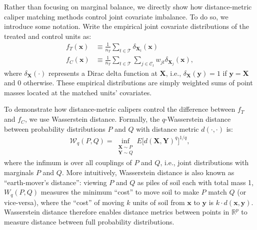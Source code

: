 \documentclass{article}
\newcommand{\bX}{\mathbf{X}}
\newcommand{\Xt}{\mathbf{X}_t}
\newcommand{\Xj}{\mathbf{X}_j}
\newcommand{\Rp}{\mathbb{R}^p}
\newcommand{\Ct}{\mathcal{C}_{t}}
\newcommand{\ind}[1]{\mathds{1} \{ #1 \} }
\begin{document}
Rather than focusing on marginal balance, we directly show how distance-metric caliper matching methods control joint covariate imbalance.
To do so, we introduce some notation.
Write the empirical joint covariate distributions of the treated and control units as:
\begin{align*}
    f_T(\mathbf{x}) 
    &\equiv \frac{1}{n_T} \sum_{t \in \mathcal{T}} \delta_{\Xt}(\mathbf{x}) \\
    f_C(\mathbf{x}) 
    &\equiv \frac{1}{n_T} \sum_{t \in \mathcal{T}} \sum_{j \in \Ct} w_{jt} \delta_{\Xj} (\mathbf{x}),
\end{align*}
where $\delta_{\bX}(\cdot)$ represents a Dirac delta function at $\bX$, i.e., $\delta_{\bX}(\mathbf{y}) = 1$ if $\mathbf{y} = \mathbf{X}$ and $0$ otherwise.
These empirical distributions are simply weighted sums of point masses located at the matched units' covariates.

To demonstrate how distance-metric calipers control the difference between $f_T$ and $f_C$, we use Wasserstein distance.
Formally, the $q$-Wasserstein distance between probability distributions $P$ and $Q$ with distance metric $d(\cdot, \cdot)$ is:
\begin{align*}
    \mathcal{W}_q(P, Q) = \inf_{\substack{\bX \sim P \\ \mathbf{Y} \sim Q}} E\big[ d(\bX, \mathbf{Y})^q \big]^{1/q},
\end{align*}
where the infimum is over all couplings of $P$ and $Q$, i.e., joint distributions with marginals $P$ and $Q$.
More intuitively, Wasserstein distance is also known as ``earth-mover's distance'':
viewing $P$ and $Q$ as piles of soil each with total mass 1, $W_q(P, Q)$ measures the minimum ``cost'' to move soil to make $P$ match $Q$ (or vice-versa), where the ``cost'' of moving $k$ units of soil from $\mathbf{x}$ to $\mathbf{y}$ is $k \cdot d(\mathbf{x}, \mathbf{y})$.
Wasserstein distance therefore enables distance metrics between points in $\Rp$ to measure distance between full probability distributions.
\end{document}
